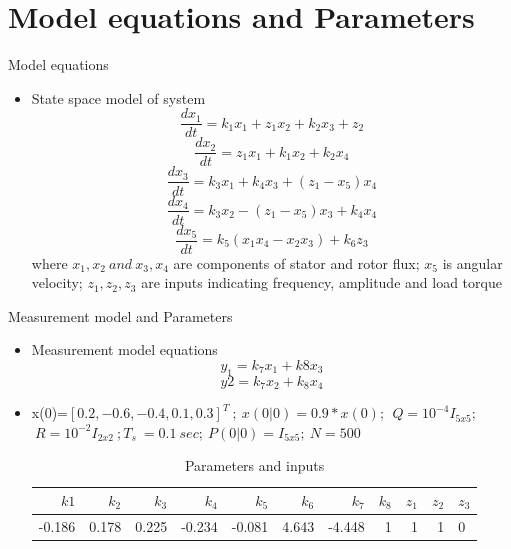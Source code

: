 \documentclass{beamer}
\begin{document}
\section{Model equations and Parameters}
\begin{frame}{Model equations}
\begin{itemize}
    \item State space model of system
    \begin{equation}
        \frac{dx_1}{dt}=k_1x_1 + z_1x_2+k_2x_3+z_2
    \end{equation}
    \begin{equation}
        \frac{dx_2}{dt}=z_1x_1 +k_1x_2+k_2x_4
    \end{equation}
    \begin{equation}
        \frac{dx_3}{dt}=k_3x_1+k_4x_3+(z_1-x_5)x_4
    \end{equation}
    \begin{equation}
        \frac{dx_4}{dt}=k_3x_2-(z_1-x_5)x_3+k_4x_4
    \end{equation}
    \begin{equation}
        \frac{dx_5}{dt}=k_5(x_1x_4-x_2x_3)+k_6z_3
    \end{equation}
    where $x_1,x_2 \ and \ x_3,x_4$ are components of stator and rotor flux; $x_5$ is angular velocity; $z_1,z_2,z_3$ are inputs indicating frequency, amplitude and load torque
\end{itemize} 
\end{frame}
\begin{frame}{Measurement model and Parameters}
\begin{itemize}
    \item Measurement model equations
    \begin{equation}
        y_1=k_7x_1+k8x_3
    \end{equation}
    \begin{equation}
        y2=k_7x_2+k_8x_4
    \end{equation}
    \item x(0)=$[0.2,-0.6,-0.4,0.1,0.3]^T\ ;\ x(0|0)=0.9*x(0);\ \ Q=10^{-4}I_{5x5};$\\
    $\ R=10^{-2}I_{2x2}\ ; T_s\ =0.1\ sec; \ P(0|0)=I_{5x5};\ N=500$
    \begin{table}[h!]
    \tiny
  \begin{center}
    \caption{Parameters and inputs}
    \label{tab:table1}
    \begin{tabular}{r|r|r|r|r|r|r|r|r|r|l} %
      $k1$ & $k_2$ & $k_3$ & $k_4$ & $k_5$ & $k_6$ & $k_7$ & $k_8$ &$z_1$ & $z_2$ & $z_3$ \\
      \hline
      -0.186 & 0.178 & 0.225 & -0.234 & -0.081&4.643& -4.448 & 1& 1&1 & 0
    \end{tabular}
  \end{center}
\end{table}
    
    
\end{itemize}
    
\end{frame}
\end{document}
